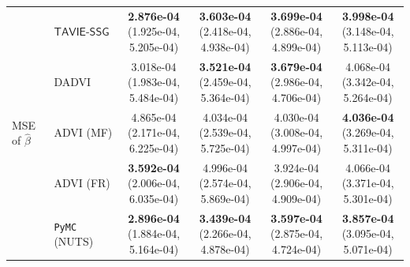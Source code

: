 \documentclass[12pt]{article}
\numberwithin{equation}{section}
\newcommand{\tssg}{\mathsf{TAVIE}\text{-}\mathsf{SSG}}
\begin{document}
{\begin{longtable}{llcccc}
\multirow{5}{*}{MSE of $\widehat{\beta}$}
& $\tssg$ & \makecell[c]{\textbf{2.876e-04}\\(1.925e-04, 5.205e-04)} & \makecell[c]{\textbf{3.603e-04}\\(2.418e-04, 4.938e-04)} & \makecell[c]{\textbf{3.699e-04}\\(2.886e-04, 4.899e-04)} & \makecell[c]{\textbf{3.998e-04}\\(3.148e-04, 5.113e-04)} \\
& DADVI & \makecell[c]{3.018e-04\\(1.983e-04, 5.484e-04)} & \makecell[c]{\textbf{3.521e-04}\\(2.459e-04, 5.364e-04)} & \makecell[c]{\textbf{3.679e-04}\\(2.986e-04, 4.706e-04)} & \makecell[c]{4.068e-04\\(3.342e-04, 5.264e-04)} \\
& ADVI (MF) & \makecell[c]{4.865e-04\\(2.171e-04, 6.225e-04)} & \makecell[c]{4.034e-04\\(2.539e-04, 5.725e-04)} & \makecell[c]{4.030e-04\\(3.008e-04, 4.997e-04)} & \makecell[c]{\textbf{4.036e-04}\\(3.269e-04, 5.311e-04)} \\
& ADVI (FR) & \makecell[c]{\textbf{3.592e-04}\\(2.006e-04, 6.035e-04)} & \makecell[c]{4.996e-04\\(2.574e-04, 5.869e-04)} & \makecell[c]{3.924e-04\\(2.906e-04, 4.909e-04)} & \makecell[c]{4.066e-04\\(3.371e-04, 5.301e-04)} \\
& \texttt{PyMC} (NUTS) & \makecell[c]{\textbf{2.896e-04}\\(1.884e-04, 5.164e-04)} & \makecell[c]{\textbf{3.439e-04}\\(2.266e-04, 4.878e-04)} & \makecell[c]{\textbf{3.597e-04}\\(2.875e-04, 4.724e-04)} & \makecell[c]{\textbf{3.857e-04}\\(3.095e-04, 5.071e-04)} \\
\hline


\end{longtable}}
\end{document}

